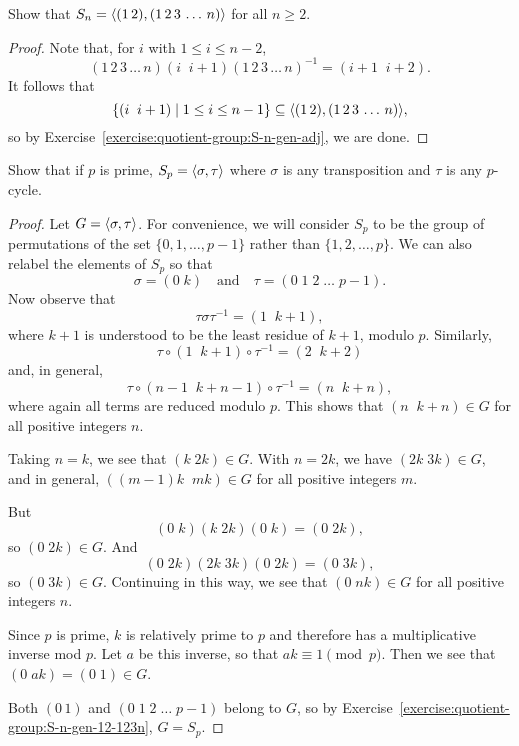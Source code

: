 \label{exercise:quotient-group:S-n-gen-12-123n}
Show that $S_n = \langle{(1\,2), (1\,2\,3\,\dots\,n)}\rangle$ for all $n\geq2$.
\begin{proof}
  Note that, for $i$ with $1\leq i\leq n-2$,
  \begin{equation*}
    (1\,2\,3\,\dots\,n)(i\;\;i+1)(1\,2\,3\,\dots\,n)^{-1}
    = (i+1\;\;i+2).
  \end{equation*}
  It follows that
  \begin{equation*}
    \{(i\;\;i+1)\mid1\leq i\leq n-1\}
    \subseteq \langle{(1\,2), (1\,2\,3\,\dots\,n)}\rangle,
  \end{equation*}
  so by Exercise~\ref{exercise:quotient-group:S-n-gen-adj}, we are
  done.
\end{proof}

 Show that if $p$ is prime, $S_p = \langle{\sigma,\tau}\rangle$ where
$\sigma$ is any transposition and $\tau$ is any $p$-cycle.
\begin{proof}
  Let $G = \langle{\sigma,\tau}\rangle$. For convenience, we will consider $S_p$
  to be the group of permutations of the set $\{0,1,\dots,p-1\}$
  rather than $\{1,2,\dots,p\}$. We can also relabel the elements of
  $S_p$ so that
  \begin{equation*}
    \sigma = (0\;k)
    \quad\text{and}\quad
    \tau = (0\;1\;2\;\dots\;p-1).
  \end{equation*}
  Now observe that
  \begin{equation*}
    \tau\sigma\tau^{-1} = (1\;\;k+1),
  \end{equation*}
  where $k+1$ is understood to be the least residue of $k+1$, modulo
  $p$. Similarly,
  \begin{equation*}
    \tau\circ(1\;\;k+1)\circ\tau^{-1} = (2\;\;k+2)
  \end{equation*}
  and, in general,
  \begin{equation*}
    \tau\circ(n-1\;\;k+n-1)\circ\tau^{-1} = (n\;\;k+n),
  \end{equation*}
  where again all terms are reduced modulo $p$. This shows that
  $(n\;\;k+n)\in G$ for all positive integers $n$.

  Taking $n = k$, we see that $(k\;2k)\in G$. With $n = 2k$, we have
  $(2k\;3k)\in G$, and in general, $((m-1)k\;\;mk)\in G$ for all
  positive integers $m$.

  But
  \begin{equation*}
    (0\;k)(k\;2k)(0\;k) = (0\;2k),
  \end{equation*}
  so $(0\;2k)\in G$. And
  \begin{equation*}
    (0\;2k)(2k\;3k)(0\;2k) = (0\;3k),
  \end{equation*}
  so $(0\;3k)\in G$. Continuing in this way, we see that
  $(0\;nk)\in G$ for all positive integers $n$.

  Since $p$ is prime, $k$ is relatively prime to $p$ and therefore has
  a multiplicative inverse mod $p$. Let $a$ be this inverse, so that
  $ak\equiv1\pmod{p}$. Then we see that $(0\;ak) = (0\;1)\in G$.

  Both $(0\,1)$ and $(0\;1\;2\;\dots\;p-1)$ belong to $G$, so by
  Exercise~\ref{exercise:quotient-group:S-n-gen-12-123n}, $G = S_p$.
\end{proof}

